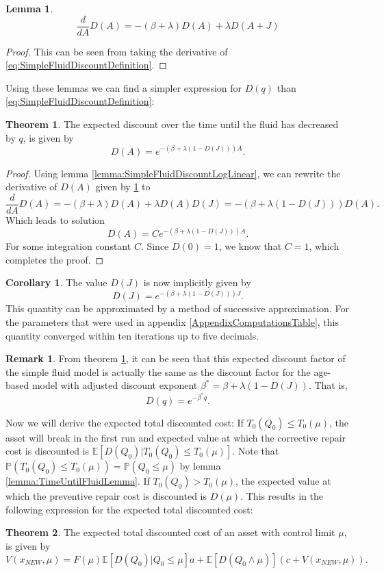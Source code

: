 \documentclass[a4paper]{thesis}
\theoremstyle{definition}
\newtheorem{remark}{Remark}[chapter]
\newtheorem{corollary}{Corollary}[chapter]
\newtheorem{theorem}{Theorem}[chapter]
\newtheorem{lemma}{Lemma}[chapter]
\begin{document}
\begin{lemma}\label{lemma:SimpleFluidDiscountODE}
	$$\frac{d}{dA}D(A)=-(\beta+\lambda)D(A)+\lambda D(A+J)$$
	\begin{proof}
		This can be seen from taking the derivative of \eqref{eq:SimpleFluidDiscountDefinition}.
	\end{proof}
\end{lemma}
Using these lemmas we can find a simpler expression for $D(q)$ than \eqref{eq:SimpleFluidDiscountDefinition}:
\begin{theorem}\label{theorem:SimpleFluidDiscountExpression}
	The expected discount over the time until the fluid has decreased by $q$, is given by
	\[
	D(A)=e^{-(\beta+\lambda(1-D(J)))A}.
	\]
	\begin{proof}
		Using lemma \ref{lemma:SimpleFluidDiscountLogLinear}, we can rewrite the derivative of $D(A)$ given by \ref{lemma:SimpleFluidDiscountODE} to
		\[
		\frac{d}{dA}D(A)=-(\beta+\lambda)D(A)+\lambda D(A)D(J)=-(\beta+\lambda(1-D(J)))D(A).
		\]
		Which leads to solution
		\[
		D(A)=Ce^{-(\beta+\lambda(1-D(J)))A}.
		\]
		For some integration constant $C$. Since $D(0)=1$, we know that $C=1$, which completes the proof.
	\end{proof}
\end{theorem}
\begin{corollary}
	The value $D(J)$ is now implicitly given by
	\[
	D(J)=e^{-(\beta+\lambda(1-D(J)))J}.
	\]
	This quantity can be approximated by a method of successive approximation.
	For the parameters that were used in appendix \ref{AppendixComputationsTable}, this quantity converged within ten iterations up to five decimals.
\end{corollary}
\begin{remark}\label{remark:SimpleFluidDiscountEquivalence}
	From theorem \ref{theorem:SimpleFluidDiscountExpression}, it can be seen that this expected discount factor of the simple fluid model is actually the same as the discount factor for the age-based model with adjusted discount exponent $\beta^*=\beta+\lambda(1-D(J))$.
	That is,
	\[
	D(q)=e^{-\beta^*q}.
	\]
\end{remark}

Now we will derive the expected total discounted cost:
If $T_0(Q_0)\leq T_0(\mu)$, the asset will break in the first run and expected value at which the corrective repair cost is discounted is $\mathbb{E}[D(Q_0)|T_0(Q_0)\leq T_0(\mu)]$.
Note that $\mathbb{P}(T_0(Q_0)\leq T_0(\mu))=\mathbb{P}(Q_0\leq\mu)$ by lemma \ref{lemma:TimeUntilFluidLemma}.
If $T_0(Q_0)> T_0(\mu)$, the expected value at which the preventive repair cost is discounted is $D(\mu)$.
This results in the following expression for the expected total discounted cost:
\begin{theorem}
	The expected total discounted cost of an asset with control limit $\mu$, is given by
	\begin{equation}\label{eq:SimpleFluidImplicitTDC}
	V(x_{NEW},\mu)=F(\mu)\mathbb{E}[D(Q_0)|Q_0\leq \mu]a+\mathbb{E}[D(Q_0\wedge\mu)](c+V(x_{NEW},\mu)).
	\end{equation}
\end{theorem}
\end{document}
